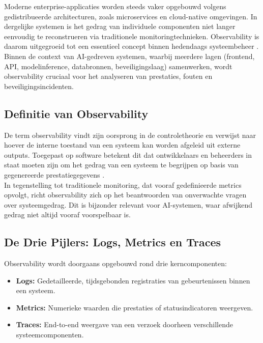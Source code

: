 Moderne enterprise-applicaties worden steeds vaker opgebouwd volgens gedistribueerde architecturen, zoals microservices en cloud-native omgevingen. In dergelijke systemen is het gedrag van individuele componenten niet langer eenvoudig te reconstrueren via traditionele monitoringtechnieken. Observability is daarom uitgegroeid tot een essentieel concept binnen hedendaags systeembeheer \autocite{sigelman2010dapper}.\\

Binnen de context van AI-gedreven systemen, waarbij meerdere lagen (frontend, API, modelinference, databronnen, beveiligingslaag) samenwerken, wordt observability cruciaal voor het analyseren van prestaties, fouten en beveiligingsincidenten.

\subsection{Definitie van Observability}

De term observability vindt zijn oorsprong in de controletheorie en verwijst naar hoever de interne toestand van een systeem kan worden afgeleid uit externe outputs. Toegepast op software betekent dit dat ontwikkelaars en beheerders in staat moeten zijn om het gedrag van een systeem te begrijpen op basis van gegenereerde prestatiegegevens \autocite{ganesan2022observability}.\\

In tegenstelling tot traditionele monitoring, dat vooraf gedefinieerde metrics opvolgt, richt observability zich op het beantwoorden van onverwachte vragen over systeemgedrag. Dit is bijzonder relevant voor AI-systemen, waar afwijkend gedrag niet altijd vooraf voorspelbaar is.

\subsection{De Drie Pijlers: Logs, Metrics en Traces}

Observability wordt doorgaans opgebouwd rond drie kerncomponenten:

\begin{itemize}
    \item \textbf{Logs:} Gedetailleerde, tijdsgebonden registraties van gebeurtenissen binnen een systeem.
    \item \textbf{Metrics:} Numerieke waarden die prestaties of statusindicatoren weergeven.
    \item \textbf{Traces:} End-to-end weergave van een verzoek doorheen verschillende systeemcomponenten.
\end{itemize}

